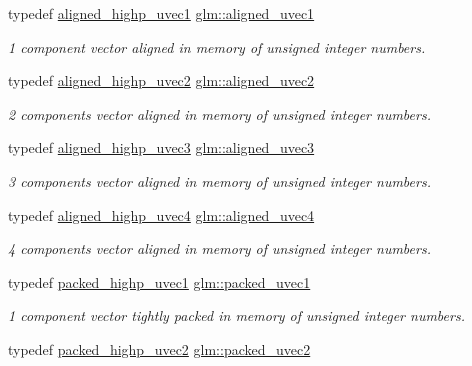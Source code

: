 \begin{DoxyCompactItemize}
typedef \mbox{\hyperlink{group__gtc__type__aligned_ga3ba8c6f6b81f57159b0536ce5d4339d0}{aligned\+\_\+highp\+\_\+uvec1}} \mbox{\hyperlink{group__gtc__type__aligned_gab0fbe9830a7129d9135b558b30eed930}{glm\+::aligned\+\_\+uvec1}}
\begin{DoxyCompactList}\small\item\em 1 component vector aligned in memory of unsigned integer numbers. \end{DoxyCompactList}\item 
typedef \mbox{\hyperlink{group__gtc__type__aligned_ga4497b2f3be81910c7a1bf632b51ac9a6}{aligned\+\_\+highp\+\_\+uvec2}} \mbox{\hyperlink{group__gtc__type__aligned_gacddd39189c2dedf7dd48c02155279124}{glm\+::aligned\+\_\+uvec2}}
\begin{DoxyCompactList}\small\item\em 2 components vector aligned in memory of unsigned integer numbers. \end{DoxyCompactList}\item 
typedef \mbox{\hyperlink{group__gtc__type__aligned_ga1d303644825af6267389d6405f490ddc}{aligned\+\_\+highp\+\_\+uvec3}} \mbox{\hyperlink{group__gtc__type__aligned_ga5dee635ca69be0f5de5630a59d89034f}{glm\+::aligned\+\_\+uvec3}}
\begin{DoxyCompactList}\small\item\em 3 components vector aligned in memory of unsigned integer numbers. \end{DoxyCompactList}\item 
typedef \mbox{\hyperlink{group__gtc__type__aligned_ga85553b476297f73c07bf3228ffb02d81}{aligned\+\_\+highp\+\_\+uvec4}} \mbox{\hyperlink{group__gtc__type__aligned_ga1e0792f3c64836e042ee3aad9bd8209c}{glm\+::aligned\+\_\+uvec4}}
\begin{DoxyCompactList}\small\item\em 4 components vector aligned in memory of unsigned integer numbers. \end{DoxyCompactList}\item 
typedef \mbox{\hyperlink{group__gtc__type__aligned_ga160352f526bef94d143ccb525095936e}{packed\+\_\+highp\+\_\+uvec1}} \mbox{\hyperlink{group__gtc__type__aligned_gab4eb372e84e817a0d29128128394df01}{glm\+::packed\+\_\+uvec1}}
\begin{DoxyCompactList}\small\item\em 1 component vector tightly packed in memory of unsigned integer numbers. \end{DoxyCompactList}\item 
typedef \mbox{\hyperlink{group__gtc__type__aligned_gafd17d664314ead069de290b1d5137c47}{packed\+\_\+highp\+\_\+uvec2}} \mbox{\hyperlink{group__gtc__type__aligned_gac05992fb0ced52150634ce1d8f95a8ad}{glm\+::packed\+\_\+uvec2}}

\end{DoxyCompactItemize}

